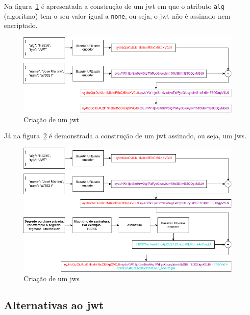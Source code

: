 Na figura~\ref{fig:buildJWT} é apresentada a construção de um \acrshort{jwt} em que o atributo \texttt{alg} (algorítmo) tem o seu valor igual a \texttt{none}, ou seja, o \acrshort{jwt} não é assinado nem encriptado.

\begin{figure}[H]
    \begin{center}
        \includegraphics[width=1\textwidth]{img/buildJWT.png}
    \end{center}
    \caption{Criação de um \acrshort{jwt}}\label{fig:buildJWT}
\end{figure}

Já na figura~\ref{fig:buildJWS} é demonstrada a construção de um \acrshort{jwt} assinado, ou seja, um \acrshort{jws}.

\begin{figure}[H]
    \begin{center}
        \includegraphics[width=1\textwidth]{img/buildJWS.png}
    \end{center}
    \caption{Criação de um \acrshort{jws}}\label{fig:buildJWS}
\end{figure}

\subsection{Alternativas ao \acrshort{jwt}}

